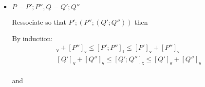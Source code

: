 \documentclass[preprint]{sigplanconf}
\renewcommand{\leq}{\leqslant}
\newcommand{\note}[1]{{\color{blue}{#1}}}
\theoremstyle{definition}
\newcommand{\vtime}[1]{[#1]_{\mathsf{v}}}
\newcommand{\etime}[1]{[#1]_{\mathsf{t}}}
\begin{document}
\begin{itemize}
\begin{itemize}
\end{itemize}

\item $P = P';P'', Q = Q';Q''$

Ressociate so that $P'; (P''; (Q'; Q''))$ then

By induction:
\begin{align}
\vtime{P'} + \vtime{P''} \leq \etime{P'; P''} \leq \vtime{P'} + \vtime{P''} \\
\vtime{Q'} + \vtime{Q''} \leq \etime{Q'; Q''} \leq \vtime{Q'} + \vtime{Q''} \\
\end{align}

and
\note{STUCK!}
\end{itemize}
\end{document}
